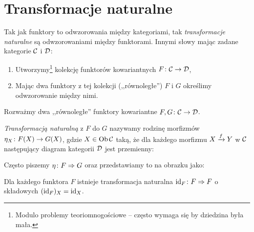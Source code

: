 \section{Transformacje naturalne}
\begin{idea}
  Tak jak funktory to odwzorowania między kategoriami, tak \emph{transformacje naturalne} są odwzorowaniami między funktorami. Innymi słowy mając zadane kategorie $\C$ i $\D$:
  \begin{enumerate}
    \item Utworzymy\footnote{Modulo problemy teoriomnogościowe -- często wymaga się by dziedzina była mała.} kolekcję funktorów kowariantnych $\morph F\C\D$,
    \item Mając dwa funktory z tej kolekcji (,,równoległe'') $F$ i $G$ określimy odwzorowanie między nimi.
  \end{enumerate}
\end{idea}

\begin{defn}
  Rozważmy dwa ,,równoległe'' funktory kowariantne $\morph {F, G}\C\D$.

  \emph{Transformacją naturalną} z $F$ do $G$ nazywamy rodzinę morfizmów $\morph{\eta_X}{F(X)}{G(X)}$, gdzie $X\in \Ob\C$ taką, że dla każdego morfizmu $\morpharr fXY$ w $\C$ następujący diagram kategorii $\D$ jest przemienny:
  \begin{center}
  \end{center}
  Często piszemy $\nattran \eta FG$ oraz przedstawiamy to na obrazku jako:
  \begin{center}
  \end{center}
\end{defn}

\begin{exmp}
  \label{exmp:transf_ident}
  Dla każdego funktora $F$ istnieje transformacja naturalna $\nattran{\id F}FF$ o składowych $(\id F)_X=\id X$.
\end{exmp}

